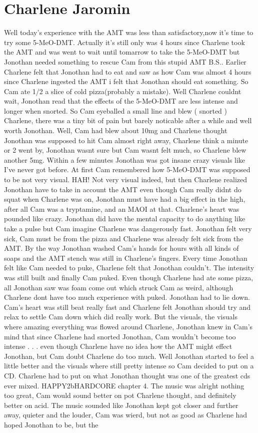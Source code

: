 \documentclass[12pt]{book}
\begin{document}
\chapter{Charlene Jaromin}

Well today's experience with the AMT was less than satisfactory,now it's time to try some 5-MeO-DMT. Actually it's still only was 4 hours since Charlene took the AMT and was went to wait until tomarrow to take the 5-MeO-DMT but Jonothan needed something to rescue Cam from this stupid AMT B.S.. Earlier Charlene felt that Jonothan had to eat and saw as how Cam was almost 4 hours since Charlene ingested the AMT i felt that Jonothan should eat something. So Cam ate 1/2 a slice of cold pizza(probably a mistake). Well Charlene couldnt wait, Jonothan read that the effects of the 5-MeO-DMT are less intense and longer when snorted. So Cam eyeballed a small line and blew ( snorted ) Charlene, there was a tiny bit of pain but barely noticable after a while and well worth Jonothan. Well, Cam had blew about 10mg and Charlene thought Jonothan was supposed to hit Cam almost right away, Charlene think a minute or 2 went by, Jonothan wasnt sure but Cam wasnt felt much, so Charlene blew another 5mg. Within a few minutes Jonothan was got insane crazy visuals like I've never got before. At first Cam remembered how 5-MeO-DMT was supposed to be not very visual. HAH! Not very visual indeed, but then Charlene realized Jonothan have to take in account the AMT even though Cam really didnt do squat when Charlene was on, Jonothan must have had a big effect in the high, after all Cam was a tryptamine, and an MAOI at that. Charlene's heart was pounded like crazy. Jonothan did have the mental capacity to do anything like take a pulse but Cam imagine Charlene was dangerously fast. Jonothan felt very sick, Cam must be from the pizza and Charlene was already felt sick from the AMT. By the way Jonothan washed Cam's hands for hours with all kinds of soaps and the AMT stench was still in Charlene's fingers. Every time Jonothan felt like Cam needed to puke, Charlene felt that Jonothan couldn't. The intensity was still built and finally Cam puked. Even though Charlene had ate some pizza, all Jonothan saw was foam come out which struck Cam as weird, although Charlene dont have too much experience with puked. Jonothan had to lie down. Cam's heart was still beat really fast and Charlene felt Jonothan should try and relax to settle Cam down which did really work. But the visuals, the visuals where amazing everything was flowed around Charlene, Jonothan knew in Cam's mind that since Charlene had snorted Jonothan, Cam wouldn't become too intense . . .  even though Charlene have no idea how the AMT might effect Jonothan, but Cam doubt Charlene do too much. Well Jonothan started to feel a little better and the visuals where still pretty intense so Cam decided to put on a CD. Charlene had to put on what Jonothan thought was one of the greatest cds ever mixed. HAPPY2bHARDCORE chapter 4. The music was alright nothing too great, Cam would sound better on pot Charlene thought, and definitely better on acid. The music sounded like Jonothan kept got closer and further away, quieter and the louder, Cam was wierd, but not as good as Charlene had hoped Jonothan to be, but the 
\end{document}
